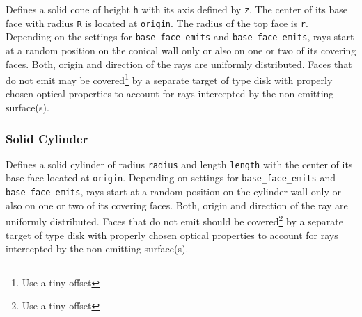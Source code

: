 \documentclass[10pt,a4paper,titlepage]{article}
\begin{document}






\vspace{0.25cm}
Defines a solid cone of height {\tt h} with its axis defined by {\tt z}. The center of its base face with radius {\tt R} is located at {\tt origin}. The radius of the top face is {\tt r}. Depending on the settings for {\tt base\_face\_emits} and {\tt base\_face\_emits}, rays start at a random position on the conical wall only or also on one or two of its covering faces. Both, origin and direction of the rays are uniformly distributed. Faces that do not emit may be covered\footnote{Use a tiny offset} by a separate target of type disk with properly chosen optical properties to account for rays intercepted by the non-emitting surface(s).

\subsubsection{Solid Cylinder}












\vspace{0.25cm}
Defines a solid cylinder of radius {\tt radius} and length {\tt length} with the center of its base face located at {\tt origin}. Depending on settings for {\tt base\_face\_emits} and {\tt base\_face\_emits}, rays start at a random position on the cylinder wall only or also on one or two of its covering faces. Both, origin and direction of the ray are uniformly distributed. Faces that do not emit should be covered\footnote{Use a tiny offset} by a separate target of type disk with properly chosen optical properties to account for rays intercepted by the non-emitting surface(s).
\end{document}
